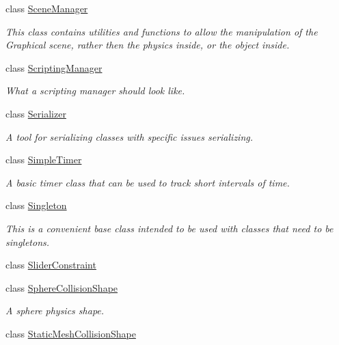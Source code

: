 \begin{DoxyCompactItemize}
class \hyperlink{classMezzanine_1_1SceneManager}{SceneManager}
\begin{DoxyCompactList}\small\item\em This class contains utilities and functions to allow the manipulation of the Graphical scene, rather then the physics inside, or the object inside. \item\end{DoxyCompactList}\item 
class \hyperlink{classMezzanine_1_1ScriptingManager}{ScriptingManager}
\begin{DoxyCompactList}\small\item\em What a scripting manager should look like. \item\end{DoxyCompactList}\item 
class \hyperlink{classMezzanine_1_1Serializer}{Serializer}
\begin{DoxyCompactList}\small\item\em A tool for serializing classes with specific issues serializing. \item\end{DoxyCompactList}\item 
class \hyperlink{classMezzanine_1_1SimpleTimer}{SimpleTimer}
\begin{DoxyCompactList}\small\item\em A basic timer class that can be used to track short intervals of time. \item\end{DoxyCompactList}\item 
class \hyperlink{classMezzanine_1_1Singleton}{Singleton}
\begin{DoxyCompactList}\small\item\em This is a convenient base class intended to be used with classes that need to be singletons. \item\end{DoxyCompactList}\item 
class \hyperlink{classMezzanine_1_1SliderConstraint}{SliderConstraint}
\item 
class \hyperlink{classMezzanine_1_1SphereCollisionShape}{SphereCollisionShape}
\begin{DoxyCompactList}\small\item\em A sphere physics shape. \item\end{DoxyCompactList}\item 
class \hyperlink{classMezzanine_1_1StaticMeshCollisionShape}{StaticMeshCollisionShape}

\end{DoxyCompactItemize}
